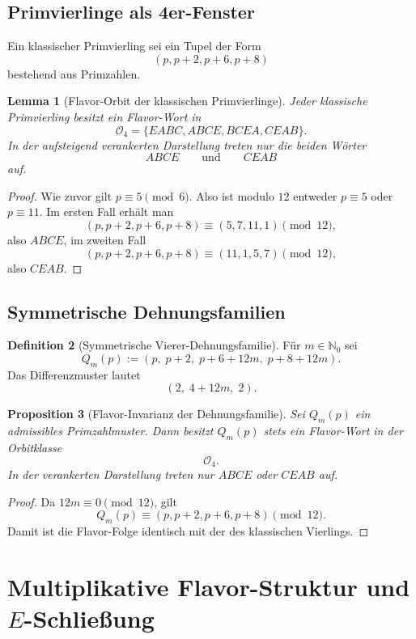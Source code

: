 \documentclass[11pt,a4paper]{article}
\theoremstyle{definition}
\newtheorem{definition}{Definition}[section]
\theoremstyle{plain}
\newtheorem{proposition}[definition]{Proposition}
\newtheorem{lemma}[definition]{Lemma}
\begin{document}
	\subsection{Primvierlinge als 4er-Fenster}
	
	Ein klassischer Primvierling sei ein Tupel der Form
	\[
	(p,p+2,p+6,p+8)
	\]
	bestehend aus Primzahlen.
	
	\begin{lemma}[Flavor-Orbit der klassischen Primvierlinge]
		Jeder klassische Primvierling besitzt ein Flavor-Wort in
		\[
		\mathcal O_4=\{EABC,ABCE,BCEA,CEAB\}.
		\]
		In der aufsteigend verankerten Darstellung treten nur die beiden Wörter
		\[
		ABCE\qquad\text{und}\qquad CEAB
		\]
		auf.
	\end{lemma}
	
	\begin{proof}
		Wie zuvor gilt $p\equiv 5\pmod 6$. Also ist modulo $12$ entweder $p\equiv 5$ oder $p\equiv 11$. Im ersten Fall erhält man
		\[
		(p,p+2,p+6,p+8)\equiv (5,7,11,1)\pmod{12},
		\]
		also $ABCE$, im zweiten Fall
		\[
		(p,p+2,p+6,p+8)\equiv (11,1,5,7)\pmod{12},
		\]
		also $CEAB$.
	\end{proof}
	
	\subsection{Symmetrische Dehnungsfamilien}
	
	\begin{definition}[Symmetrische Vierer-Dehnungsfamilie]
		Für $m\in\mathbb N_0$ sei
		\[
		Q_m(p):=(p,\;p+2,\;p+6+12m,\;p+8+12m).
		\]
		Das Differenzmuster lautet
		\[
		(2,\;4+12m,\;2).
		\]
	\end{definition}
	
	\begin{proposition}[Flavor-Invarianz der Dehnungsfamilie]
		Sei $Q_m(p)$ ein admissibles Primzahlmuster. Dann besitzt $Q_m(p)$ stets ein Flavor-Wort in der Orbitklasse
		\[
		\mathcal O_4.
		\]
		In der verankerten Darstellung treten nur $ABCE$ oder $CEAB$ auf.
	\end{proposition}
	
	\begin{proof}
		Da $12m\equiv 0\pmod{12}$, gilt
		\[
		Q_m(p)\equiv (p,p+2,p+6,p+8)\pmod{12}.
		\]
		Damit ist die Flavor-Folge identisch mit der des klassischen Vierlings.
	\end{proof}
	
	\section{Multiplikative Flavor-Struktur und $E$-Schließung}
	
\end{document}
